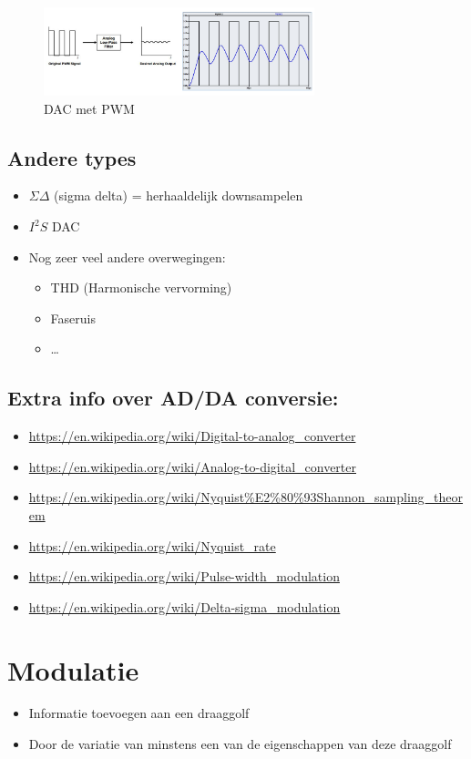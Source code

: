 \documentclass{article}
\begin{document}
\begin{figure}[H]
    \centering
    \includegraphics[width=0.7\textwidth]{Screenshot_20200224_123240.png}
    \caption{DAC met PWM}
\end{figure}

\subsection{Andere types}
\begin{itemize}
    \item $\Sigma\Delta$ (sigma delta) = herhaaldelijk downsampelen
    \item $I^2S$ DAC
    \item Nog zeer veel andere overwegingen:
    \begin{itemize}
        \item THD (Harmonische vervorming)
        \item Faseruis
        \item \dots
    \end{itemize}
\end{itemize}

\subsection{Extra info over AD/DA conversie:}
\begin{itemize}
    \item \url{https://en.wikipedia.org/wiki/Digital-to-analog_converter}
    \item \url{https://en.wikipedia.org/wiki/Analog-to-digital_converter}
    \item \url{https://en.wikipedia.org/wiki/Nyquist%E2%80%93Shannon_sampling_theorem}
    \item \url{https://en.wikipedia.org/wiki/Nyquist_rate}
    \item \url{https://en.wikipedia.org/wiki/Pulse-width_modulation}
    \item \url{https://en.wikipedia.org/wiki/Delta-sigma_modulation}
\end{itemize}

\section{Modulatie}
\begin{itemize}
    \item Informatie toevoegen aan een draaggolf
    \item Door de variatie van minstens een van de eigenschappen van deze draaggolf
\end{itemize}
\end{document}
